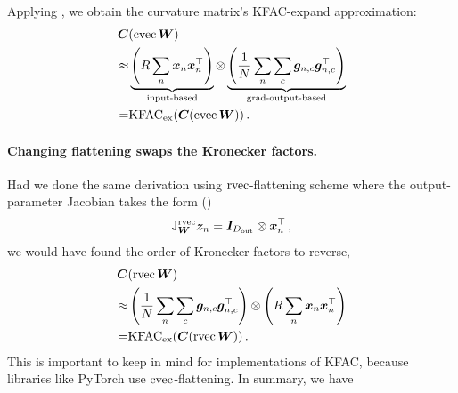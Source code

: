 Applying , we obtain the curvature matrix's KFAC-expand approximation:
\begin{align*}
  {\bm{C}}&(\operatorname{cvec} {\bm{W}}) \\
  \approx&
           \underbrace{\left( R \sum_n {\bm{x}}_n {\bm{x}}_n^{\top} \right)}_{\text{input-based}}
           \otimes
           \underbrace{\left( \frac{1}{N} \sum_n \sum_c {\bm{g}}_{n,c} {\bm{g}}_{n,c}^{\top} \right)}_{\text{grad-output-based}}
  \\
  =& \mathrm{KFAC}_{\text{ex}}({\bm{C}}(\operatorname{cvec} {\bm{W}}))\,.
\end{align*}

\paragraph{Changing flattening swaps the Kronecker factors.}
Had we done the same derivation using $\operatorname{rvec}$-flattening scheme where the output-parameter Jacobian takes the form ()
$$ \mathrm{J}^{\operatorname{rvec}}_{{\bm{W}}}{\bm{z}}_n = {\bm{I}}_{D_{\text{out}}} \otimes {\bm{x}}_n^{\top}\,,$$
we would have found the order of Kronecker factors to reverse,
\begin{align*}
  {\bm{C}}&(\operatorname{rvec} {\bm{W}}) \\
  \approx&
           \left( \frac{1}{N} \sum_n \sum_c {\bm{g}}_{n,c} {\bm{g}}_{n,c}^{\top} \right)
           \otimes
           \left( R \sum_n {\bm{x}}_n {\bm{x}}_n^{\top} \right)
  \\
  =& \mathrm{KFAC}_{\text{ex}}({\bm{C}}(\operatorname{rvec} {\bm{W}}))\,.
\end{align*}
This is important to keep in mind for implementations of KFAC, because libraries like PyTorch use $\operatorname{cvec}$-flattening.
In summary, we have

\switchcolumn[1]
\switchcolumn[0]

